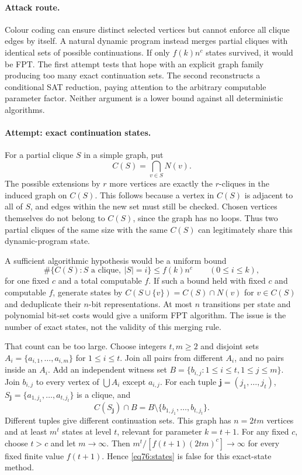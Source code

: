 \documentclass[11pt,a4paper]{article}
\numberwithin{equation}{section}
\begin{document}
\paragraph{Attack route.}
Colour coding can ensure distinct selected vertices but cannot enforce
all clique edges by itself. A natural dynamic program instead merges
partial cliques with identical sets of possible continuations. If only
$f(k)n^c$ states survived, it would be FPT. The first attempt tests that
hope with an explicit graph family producing too many exact continuation
sets. The second reconstructs a conditional SAT reduction, paying
attention to the arbitrary computable parameter factor. Neither argument
is a lower bound against all deterministic algorithms.

\paragraph{Attempt: exact continuation states.}
For a partial clique $S$ in a simple graph, put
\[
 C(S)=\bigcap_{v\in S}N(v).
\]
The possible extensions by $r$ more vertices are exactly the $r$-cliques
in the induced graph on $C(S)$. This follows because a vertex in $C(S)$
is adjacent to all of $S$, and edges within the new set must still be
checked. Chosen vertices themselves do not belong to $C(S)$, since the
graph has no loops. Thus two partial cliques of the same size with the
same $C(S)$ can legitimately share this dynamic-program state.

A sufficient algorithmic hypothesis would be a uniform bound
\begin{equation}\label{eq76:states}
 \#\{C(S):S\text{ a clique},\ |S|=i\}\leq f(k)n^c
 \qquad(0\leq i\leq k),
\end{equation}
for one fixed $c$ and a total computable $f$.
If such a bound held with fixed $c$ and computable $f$, generate states by
$C(S\cup\{v\})=C(S)\cap N(v)$ for $v\in C(S)$ and deduplicate their
$n$-bit representations. At most $n$ transitions per state and polynomial
bit-set costs would give a uniform FPT algorithm. The issue is the number
of exact states, not the validity of this merging rule.

That count can be too large. Choose integers $t,m\geq2$ and disjoint sets
$A_i=\{a_{i,1},\ldots,a_{i,m}\}$ for $1\leq i\leq t$. Join all pairs
from different $A_i$, and no pairs inside an $A_i$. Add an independent
witness set $B=\{b_{i,j}:1\leq i\leq t,1\leq j\leq m\}$.
Join $b_{i,j}$ to every vertex of $\bigcup A_i$ except $a_{i,j}$.
For each tuple $\mathbf j=(j_1,\ldots,j_t)$,
$S_{\mathbf j}=\{a_{1,j_1},\ldots,a_{t,j_t}\}$ is a clique, and
\begin{equation}\label{eq76:signature}
 C(S_{\mathbf j})\cap B
   =B\setminus\{b_{1,j_1},\ldots,b_{t,j_t}\}.
\end{equation}
Different tuples give different continuation sets. This graph has
$n=2tm$ vertices and at least $m^t$ states at level $t$, relevant for
parameter $k=t+1$. For any fixed $c$, choose $t>c$ and let $m\to\infty$.
Then $m^t/[f(t+1)(2tm)^c]\to\infty$ for every fixed finite value
$f(t+1)$. Hence \eqref{eq76:states} is false for this exact-state method.
\end{document}
